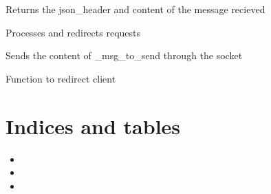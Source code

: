 \documentclass[letterpaper,10pt,english]{sphinxmanual}
\begin{document}
\begin{fulllineitems}
\begin{fulllineitems}
\label{\detokenize{lb_msg:lb_msg.LoadBalancerMessage.readFromSocket}}
Returns the json\_header and content of the message recieved

\end{fulllineitems}


\begin{fulllineitems}
\label{\detokenize{lb_msg:lb_msg.LoadBalancerMessage.processTask}}
Processes and redirects requests

\end{fulllineitems}


\begin{fulllineitems}
\label{\detokenize{lb_msg:lb_msg.LoadBalancerMessage._send_data_to_client}}
Sends the content of \_msg\_to\_send through the socket

\end{fulllineitems}


\begin{fulllineitems}
\label{\detokenize{lb_msg:lb_msg.LoadBalancerMessage.processClient}}
Function to redirect client

\end{fulllineitems}


\end{fulllineitems}



\chapter{Indices and tables}
\label{\detokenize{index:indices-and-tables}}\begin{itemize}
\item {} 

\item {} 

\item {} 

\end{itemize}
\end{document}
